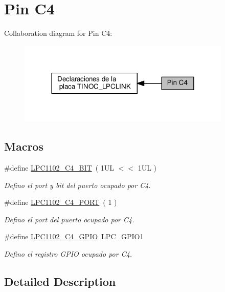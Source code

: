 \hypertarget{group___p_i_n_c4}{}\section{Pin C4}
\label{group___p_i_n_c4}
Collaboration diagram for Pin C4\+:\nopagebreak
\begin{figure}[H]
\begin{center}
\leavevmode
\includegraphics[width=288pt]{group___p_i_n_c4}
\end{center}
\end{figure}
\subsection*{Macros}
\begin{DoxyCompactItemize}
\item 
\#define \hyperlink{group___p_i_n_c4_ga6634a8d3b9fbbf4a90aa74fe9173de32}{L\+P\+C1102\+\_\+\+C4\+\_\+\+B\+IT}~( 1\+U\+L $<$$<$ 1\+U\+L )
\begin{DoxyCompactList}\small\item\em Defino el port y bit del puerto ocupado por C4. \end{DoxyCompactList}\item 
\#define \hyperlink{group___p_i_n_c4_gacd93f24da1e5789ee014bc52402d0bb5}{L\+P\+C1102\+\_\+\+C4\+\_\+\+P\+O\+RT}~( 1 )
\begin{DoxyCompactList}\small\item\em Defino el port del puerto ocupado por C4. \end{DoxyCompactList}\item 
\#define \hyperlink{group___p_i_n_c4_gad0c89c3a531c5e51f42bd3bcadd0c214}{L\+P\+C1102\+\_\+\+C4\+\_\+\+G\+P\+IO}~L\+P\+C\+\_\+\+G\+P\+I\+O1
\begin{DoxyCompactList}\small\item\em Defino el registro G\+P\+IO ocupado por C4. \end{DoxyCompactList}\end{DoxyCompactItemize}


\subsection{Detailed Description}


